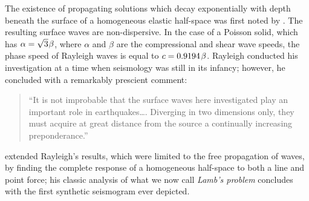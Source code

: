 The existence of propagating solutions which decay
exponentially with depth beneath the surface of a
homogeneous elastic half-space was first noted by
\textcite{rayleigh85}.  The resulting surface waves are
non-dispersive.  In the case of a Poisson solid, which has
$\alpha=\sqrt{3}\hspace{0.2 mm}\beta$, where $\alpha$ and $\beta$
are the compressional and shear wave speeds, the
phase speed of Rayleigh waves is equal to
$c=0.9194\hspace{0.4 mm}\beta$.
Rayleigh conducted his investigation at a time
when seismology was still in its infancy;
however, he concluded with a remarkably prescient comment:
\begin{quote}
``It is not improbable that the surface waves
here investigated play an important role in
earthquakes\ldots.  Diverging in two dimensions
only, they must acquire at great distance from
the source a continually increasing preponderance.''
\end{quote}
\textcite{lamb04} extended Rayleigh's results,
which were limited to the free propagation of waves,
by finding the complete response of a homogeneous
half-space to both a line and point force; his classic
analysis of what we now call {\em Lamb's problem\/}
%
concludes with the first synthetic seismogram ever depicted.

